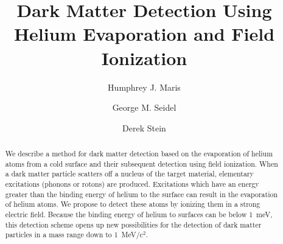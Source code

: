 \documentclass[10pt, letterpaper, reprint, superscriptaddress, aps, prl]
{revtex4-1} \usepackage[latin1]{inputenc}
\begin{document}
	
	
\title{Dark Matter Detection Using Helium Evaporation and Field Ionization}
\author{Humphrey J. Maris} 
\author{George M. Seidel} 
\author{Derek Stein}



\begin{abstract} 
We describe a method for dark matter detection based on the evaporation of helium atoms from a cold surface and their subsequent detection using field ionization.  When a dark matter particle scatters off a nucleus of the target material, elementary excitations (phonons or rotons) are produced. 
Excitations which have an energy greater than the binding energy of helium to the surface can result in the evaporation of helium atoms. 
We propose to detect these atoms by ionizing them in a strong electric field. 
Because the binding energy of helium to surfaces can be below 1~meV, this detection scheme opens up new possibilities for the detection of dark matter particles in a mass range down to 1~MeV/c$^{2}$.

\end{abstract} 
\maketitle
\end{document}
